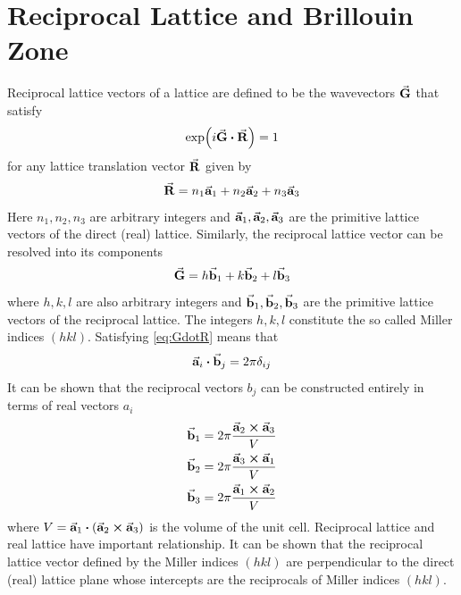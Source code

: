\appendix

\makeatletter
\renewcommand{\@makechapterhead}[1]{\vspace *{-10\p@ }{\parindent \z@ 
\raggedright \normalfont \ifnum \c@secnumdepth >\m@ne \Huge \bfseries 
\@chapapp \space \thechapter \vskip 10\p@ \fi #1\par \nobreak \vskip 30\p@ }}
\makeatother

\chapter{Reciprocal Lattice and Brillouin Zone}
Reciprocal lattice vectors of a lattice are defined to be the wavevectors  $\va{G}$ that satisfy 
\begin{equation} \label{eq:GdotR}
    \exp(i \va{G} \vdot \va{R} ) = 1
\end{equation}
for any lattice translation vector $\va{R}$ given by
\begin{equation}
    \va{R} = n_1 \va{a}_1 + n_2 \va{a}_2 +n_3 \va{a}_3
\end{equation}
Here $n_1, n_2, n_3$ are arbitrary integers and $\va{a}_1, \va{a}_2, \va{a}_3$ are the primitive lattice vectors of the direct (real) lattice. Similarly, the reciprocal lattice vector can be resolved into its components 
\begin{equation}
    \va{G} = h \va{b}_1 + k \va{b}_2 + l \va{b}_3
\end{equation}
where $h, k, l$ are also  arbitrary integers and $\va{b}_1, \va{b}_2, \va{b}_3$ are the primitive lattice vectors of the reciprocal lattice. The integers $h, k, l$ constitute the so called Miller indices $(hkl)$. Satisfying \eqref{eq:GdotR} means that 
\begin{equation*}
    \va{a}_i \vdot \va{b}_j = 2 \pi \delta_{ij}
\end{equation*}
It can be shown that the reciprocal vectors $b_j$ can be constructed entirely in terms of real vectors $a_i$
\begin{align}
    \va{b}_1 &= 2 \pi \frac{\va{a}_2 \crossproduct \va{a}_3}{V} \\
    \va{b}_2 &= 2 \pi \frac{\va{a}_3 \crossproduct \va{a}_1}{V} \\
    \va{b}_3 &= 2 \pi \frac{\va{a}_1 \crossproduct \va{a}_2}{V} 
\end{align}
where $V = \va{a}_1 \vdot (\va{a}_2 \crossproduct \va{a}_3)$ is the volume of the unit cell. Reciprocal lattice and real lattice have important relationship. It can be shown that the reciprocal lattice vector defined by the Miller indices $(hkl)$ are perpendicular to the direct (real) lattice plane whose intercepts are the reciprocals of Miller indices $(hkl)$. 

